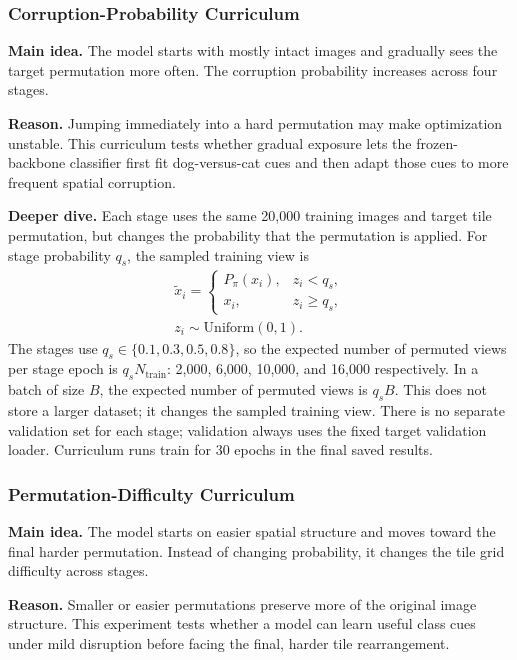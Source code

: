 \documentclass[12pt]{article}
\begin{document}
\subsubsection{Corruption-Probability Curriculum}

\textbf{Main idea.} The model starts with mostly intact images and gradually sees the target permutation more often. The corruption probability increases across four stages.

\textbf{Reason.} Jumping immediately into a hard permutation may make optimization unstable. This curriculum tests whether gradual exposure lets the frozen-backbone classifier first fit dog-versus-cat cues and then adapt those cues to more frequent spatial corruption.

\textbf{Deeper dive.} Each stage uses the same 20,000 training images and target tile permutation, but changes the probability that the permutation is applied. For stage probability $q_s$, the sampled training view is
\[
  \begin{aligned}
  \tilde{x}_i =
  \begin{cases}
    P_{\pi}(x_i), & z_i < q_s,\\
    x_i, & z_i \ge q_s,
  \end{cases}
  \\
  z_i \sim \mathrm{Uniform}(0,1).
  \end{aligned}
\]
The stages use $q_s \in \{0.1,0.3,0.5,0.8\}$, so the expected number of permuted views per stage epoch is $q_s N_{\mathrm{train}}$: 2,000, 6,000, 10,000, and 16,000 respectively. In a batch of size $B$, the expected number of permuted views is $q_sB$. This does not store a larger dataset; it changes the sampled training view. There is no separate validation set for each stage; validation always uses the fixed target validation loader. Curriculum runs train for 30 epochs in the final saved results.

\subsubsection{Permutation-Difficulty Curriculum}

\textbf{Main idea.} The model starts on easier spatial structure and moves toward the final harder permutation. Instead of changing probability, it changes the tile grid difficulty across stages.

\textbf{Reason.} Smaller or easier permutations preserve more of the original image structure. This experiment tests whether a model can learn useful class cues under mild disruption before facing the final, harder tile rearrangement.
\end{document}
